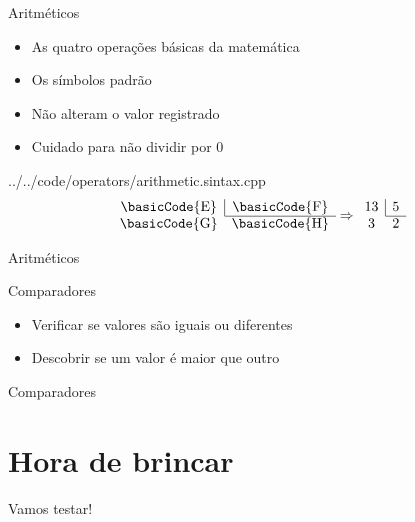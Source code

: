 \documentclass[11pt]{beamer}
\begin{document}
	\begin{frame}{Aritméticos}
		\begin{itemize}
			\presentationPause\item As quatro operações básicas da matemática
			\presentationPause\item Os símbolos padrão
			\presentationPause\item Não alteram o valor registrado
			\presentationPause\item Cuidado para não dividir por 0
		\end{itemize}
		\presentationPause
		{../../code/operators/arithmetic.sintax.cpp}
		\presentationPause\begin{equation}\nonumber
			\begin{array}{cc}
				\text{\basicCode{E}} & \multicolumn{1}{|c}{\text{\basicCode{F}}} \\ \cline{2-2} 
				\text{\basicCode{G}} & \text{\basicCode{H}}
			\end{array} \Rightarrow \begin{array}{cc}
				13 & \multicolumn{1}{|c}{5} \\ \cline{2-2} 
					3 & 2		
			\end{array}
		\end{equation}
	\end{frame}\begin{frame}{Aritméticos}
		
	\end{frame}

\begin{frame}{Comparadores}
	\begin{itemize}
		\presentationPause\item Verificar se valores são iguais ou diferentes
		\presentationPause\item Descobrir se um valor é maior que outro
	\end{itemize}
	\presentationPause
\end{frame}\begin{frame}{Comparadores}
	
\end{frame}

\section{Hora de brincar}
	\begin{frame}
		\begin{center}\Huge
			Vamos testar!
		\end{center}
	\end{frame}
\end{document}
